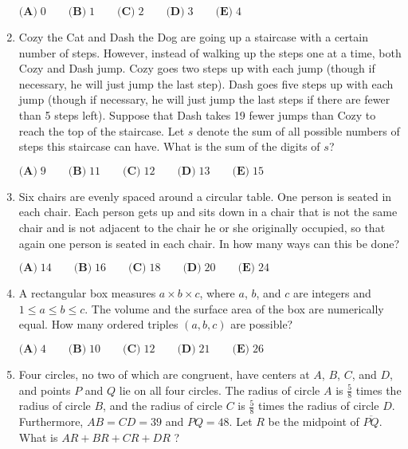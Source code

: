 \documentclass{article}
\begin{document}
\begin{enumerate}[label=\arabic*., itemsep=0.5em]
$\textbf{(A)}\; 0 \qquad\textbf{(B)}\; 1 \qquad\textbf{(C)}\; 2 \qquad\textbf{(D)}\; 3 \qquad\textbf{(E)}\; 4$\par \vspace{0.5em}\item Cozy the Cat and Dash the Dog are going up a staircase with a certain number of steps. However, instead of walking up the steps one at a time, both Cozy and Dash jump. Cozy goes two steps up with each jump (though if necessary, he will just jump the last step). Dash goes five steps up with each jump (though if necessary, he will just jump the last steps if there are fewer than 5 steps left). Suppose that Dash takes 19 fewer jumps than Cozy to reach the top of the staircase. Let $s$ denote the sum of all possible numbers of steps this staircase can have. What is the sum of the digits of $s$?

$\textbf{(A)}\; 9 \qquad\textbf{(B)}\; 11 \qquad\textbf{(C)}\; 12 \qquad\textbf{(D)}\; 13 \qquad\textbf{(E)}\; 15$\par \vspace{0.5em}\item Six chairs are evenly spaced around a circular table. One person is seated in each chair. Each person gets up and sits down in a chair that is not the same chair and is not adjacent to the chair he or she originally occupied, so that again one person is seated in each chair. In how many ways can this be done?

$\textbf{(A)}\; 14 \qquad\textbf{(B)}\; 16 \qquad\textbf{(C)}\; 18 \qquad\textbf{(D)}\; 20 \qquad\textbf{(E)}\; 24$\par \vspace{0.5em}\item A rectangular box measures $a \times b \times c$, where $a$, $b$, and $c$ are integers and $1\leq a \leq b \leq c$. The volume and the surface area of the box are numerically equal. How many ordered triples $(a,b,c)$ are possible?

$\textbf{(A)}\; 4 \qquad\textbf{(B)}\; 10 \qquad\textbf{(C)}\; 12 \qquad\textbf{(D)}\; 21 \qquad\textbf{(E)}\; 26$\par \vspace{0.5em}\item Four circles, no two of which are congruent, have centers at $A$, $B$, $C$, and $D$, and points $P$ and $Q$ lie on all four circles. The radius of circle $A$ is $\tfrac{5}{8}$ times the radius of circle $B$, and the radius of circle $C$ is $\tfrac{5}{8}$ times the radius of circle $D$. Furthermore, $AB = CD = 39$ and $PQ = 48$. Let $R$ be the midpoint of $\overline{PQ}$. What is $AR+BR+CR+DR$ ?


\end{enumerate}
\end{document}
